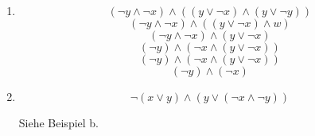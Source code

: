 \documentclass[a4paper]{article}
\begin{document}
\begin{enumerate}
\begin{enumerate}
			\item
			\begin{equation*}
				(\lnot y \land \lnot x) \land ((y \lor \lnot x) \land (y \lor \lnot y))
			\end{equation*}
			\begin{equation*}
				(\lnot y \land \lnot x) \land ((y \lor \lnot x) \land w)
			\end{equation*}
			\begin{equation*}
				(\lnot y \land \lnot x) \land (y \lor \lnot x)
			\end{equation*}
			\begin{equation*}
				(\lnot y) \land (\lnot x \land (y \lor \lnot x))
			\end{equation*}
			\begin{equation*}
				(\lnot y) \land (\lnot x \land (y \lor \lnot x))
			\end{equation*}
			\begin{equation*}
				(\lnot y) \land (\lnot x)
			\end{equation*}
			
			\item
			\begin{equation*}
				\lnot (x \lor y) \land (y \lor (\lnot x \land \lnot y))
			\end{equation*}
			\begin{center}
				Siehe Beispiel b.
			\end{center}
			

\end{enumerate}
\end{enumerate}
\end{document}
